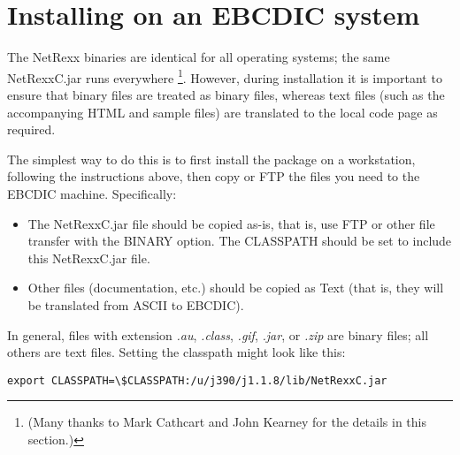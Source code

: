 \chapter{Installing on an EBCDIC system}




The NetRexx binaries are identical for all operating systems; the same
NetRexxC.jar runs everywhere \footnote{(Many thanks to Mark Cathcart
  and John Kearney for the details in this section.)}.
However, during installation it is important to ensure that binary files
are treated as binary files, whereas text files (such as the
accompanying HTML and sample files) are translated to the local code
page as required.

The simplest way to do this is to first install the package on a
workstation, following the instructions above, then copy or FTP the
files you need to the EBCDIC machine.  Specifically:
\begin{itemize}
\item The NetRexxC.jar file should be copied as-is, that is, use
FTP or other file transfer with the BINARY option.  The CLASSPATH should
be set to include this NetRexxC.jar file.
\item Other files (documentation, etc.) should be copied as Text (that is,
they will be translated from ASCII to EBCDIC).
\end{itemize}

In general, files with extension \emph{.au}, \emph{.class}, \emph{.gif}, \emph{.jar},
or \emph{.zip} are binary files; all others are text files.
Setting the classpath might look like this:
\begin{verbatim}
export CLASSPATH=\$CLASSPATH:/u/j390/j1.1.8/lib/NetRexxC.jar
\end{verbatim}
